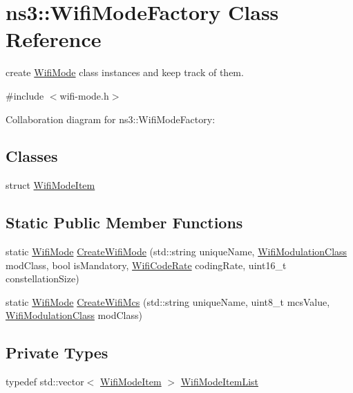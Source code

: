 \hypertarget{classns3_1_1WifiModeFactory}{}\section{ns3\+:\+:Wifi\+Mode\+Factory Class Reference}
\label{classns3_1_1WifiModeFactory}


create \hyperlink{classns3_1_1WifiMode}{Wifi\+Mode} class instances and keep track of them.  




{\ttfamily \#include $<$wifi-\/mode.\+h$>$}



Collaboration diagram for ns3\+:\+:Wifi\+Mode\+Factory\+:
\subsection*{Classes}
\begin{DoxyCompactItemize}
\item 
struct \hyperlink{structns3_1_1WifiModeFactory_1_1WifiModeItem}{Wifi\+Mode\+Item}
\end{DoxyCompactItemize}
\subsection*{Static Public Member Functions}
\begin{DoxyCompactItemize}
\item 
static \hyperlink{classns3_1_1WifiMode}{Wifi\+Mode} \hyperlink{classns3_1_1WifiModeFactory_a91e233a272c9bd36bca8d51a5da49b41}{Create\+Wifi\+Mode} (std\+::string unique\+Name, \hyperlink{namespacens3_aa999e1221606a2b21b1eb33c2007c217}{Wifi\+Modulation\+Class} mod\+Class, bool is\+Mandatory, \hyperlink{namespacens3_aeaf3a86fd4bdb7829955238fba43e2ad}{Wifi\+Code\+Rate} coding\+Rate, uint16\+\_\+t constellation\+Size)
\item 
static \hyperlink{classns3_1_1WifiMode}{Wifi\+Mode} \hyperlink{classns3_1_1WifiModeFactory_ac3e6d9eb924873474e4122c86deb44c9}{Create\+Wifi\+Mcs} (std\+::string unique\+Name, uint8\+\_\+t mcs\+Value, \hyperlink{namespacens3_aa999e1221606a2b21b1eb33c2007c217}{Wifi\+Modulation\+Class} mod\+Class)
\end{DoxyCompactItemize}
\subsection*{Private Types}
\begin{DoxyCompactItemize}
\item 
typedef std\+::vector$<$ \hyperlink{structns3_1_1WifiModeFactory_1_1WifiModeItem}{Wifi\+Mode\+Item} $>$ \hyperlink{classns3_1_1WifiModeFactory_a7fada023770ee50e77969b42324f16b5}{Wifi\+Mode\+Item\+List}
\end{DoxyCompactItemize}
